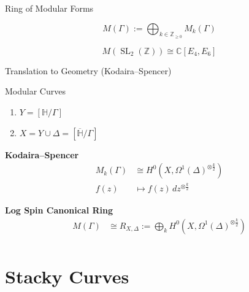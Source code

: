 \documentclass{beamer}
\theoremstyle{remark}
\newcommand\BH{{\mathbb H}}
\newcommand\BC{{\mathbb C}}
\newcommand\BZ{{\mathbb Z}}
\newcommand{\SL}{\operatorname{SL}}
\begin{document}

\begin{frame}{Ring of Modular Forms}

\begin{definition}
\[
	M(\Gamma) := \bigoplus_{k \in \BZ_{\geq 0}} M_k(\Gamma)
\]
\end{definition}


\begin{example}
\[
	M(\SL_2(\BZ)) \cong \BC[E_4,E_6]
\]
\end{example}

\end{frame}


\begin{frame}{Translation to Geometry (Kodaira--Spencer)}
\begin{block}{Modular Curves}
\begin{enumerate}
  \item $Y = [\BH / \Gamma]$
  \item $X = Y \cup \Delta = [\overline{\BH} / \Gamma]$
\end{enumerate}
\end{block}


\begin{block}{\textbf{Kodaira--Spencer}}
\begin{align*}
  M_k(\Gamma) &\cong H^0(X, \Omega^1(\Delta)^{\otimes \frac{k}{2}}) \\
	f(z) &\mapsto f(z)\, dz^{\otimes \frac{k}{2}}
\end{align*}
\end{block}


\begin{block}{\textbf{Log Spin Canonical Ring}}
\begin{align*}
  M(\Gamma) &\cong R_{X,\Delta} := \bigoplus_k H^0(X, \Omega^1(\Delta)^{\otimes \frac{k}{2}}) \\
\end{align*}
\end{block}

\end{frame}

\section{Stacky Curves}
\end{document}
